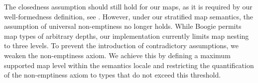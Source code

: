 The closedness assumption should still hold for our maps, as it is required by our well-formedness definition, see .
However, under our stratified map semantics, the assumption of universal non-emptiness no longer holds.
While Boogie permits map types of arbitrary depths, our implementation currently limits map nesting to three levels.
To prevent the introduction of contradictory assumptions, we weaken the non-emptiness axiom.
We achieve this by defining a maximum supported map level within the semantics locale
and restricting the quantification of the non-emptiness axiom to types that do not exceed this threshold.




